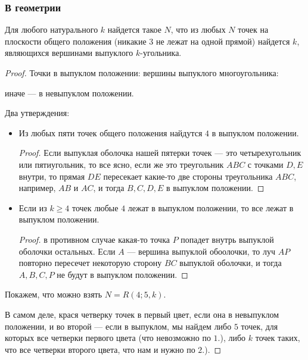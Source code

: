 \begin{normalsize}
\begin{theorem} [Hindman, 1974]
\end{theorem}


\subsubsection*{В геометрии}

\begin{theorem} 

    Для любого натурального $k$ найдется такое $N$, что из любых $N$ точек на плоскости общего положения (никакие $3$ не лежат на одной прямой) найдется $k$, являющихся вершинами выпуклого $k$-угольника.
    
\end{theorem}

\begin{proof}

    Точки в выпуклом положении: вершины выпуклого многоугольника:

    иначе --- в невыпуклом положении.

    Два утверждения:

    \begin{itemize}
        \item Из любых пяти точек общего положения найдутся $4$ в выпуклом положении.
        
        \begin{proof}
        
            Если выпуклая оболочка нашей пятерки точек --- это четырехугольник или пятиугольник, то все ясно, если же это треугольник $ABC$ с точками $D, E$ внутри, то прямая $DE$ пересекает какие-то две стороны треугольника $ABC$, например, $AB$ и $AC$, и тогда $B, C, D, E$ в выпуклом положении.
        
        \end{proof}

        \item Если из $k \geq 4$ точек любые $4$ лежат в выпуклом положении, то все лежат в выпуклом положении.
        
        \begin{proof}

            в противном случае какая-то точка $P$ попадет внутрь выпуклой оболочки остальных. Если $A$ --- вершина выпуклой обоолочки, то луч $AP$ повторно пересечет некоторую сторону $BC$ выпуклой оболочки, и тогда $A, B, C, P$ не будут в выпуклом положении.
        
        \end{proof}

    \end{itemize}

    Покажем, что можно взять $N = R(4; 5, k)$.

    В самом деле, крася четверку точек в первый цвет, если она в невыпуклом положении, и во второй --- если в выпуклом, мы найдем либо $5$ точек, для которых все четверки первого цвета (что невозможно по $1.$), либо $k$ точек таких, что все четверки второго цвета, что нам и нужно по $2.$).
    
\end{proof}

\end{normalsize}